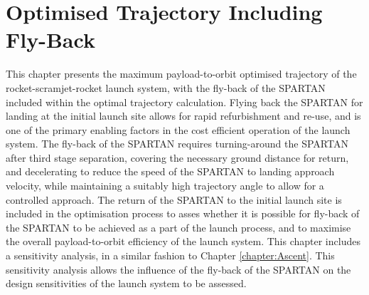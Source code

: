 
\cleardoublepage
\chapter{Optimised Trajectory Including Fly-Back}\label{chapter:Flyback}


This chapter presents the maximum payload-to-orbit optimised trajectory of the rocket-scramjet-rocket launch system, with the fly-back of the SPARTAN included within the optimal trajectory calculation. 
Flying back the SPARTAN for landing at the initial launch site allows for rapid refurbishment and re-use, and is one of the primary enabling factors in the cost efficient operation of the launch system. 
The fly-back of the SPARTAN requires turning-around the SPARTAN after third stage separation, covering the necessary ground distance for return, and decelerating to reduce the speed of the SPARTAN to landing approach velocity, while maintaining a suitably high trajectory angle to allow for a controlled approach. 
The return of the SPARTAN to the initial launch site is included in the optimisation process to asses whether it is possible for fly-back of the SPARTAN to be achieved as a part of the launch process, and to maximise the overall payload-to-orbit efficiency of the launch system. 
This chapter includes a sensitivity analysis, in a similar fashion to Chapter \ref{chapter:Ascent}. 
This sensitivity analysis allows the influence of the fly-back of the SPARTAN on the design sensitivities of the launch system to be assessed.


